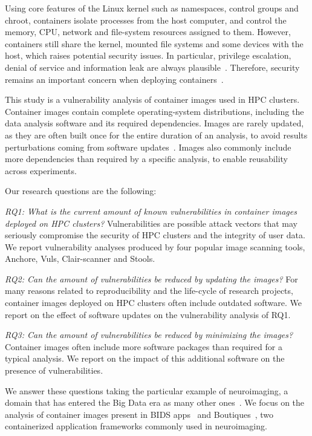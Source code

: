\documentclass[a4paper,num-refs]{oup-contemporary}
\begin{document}
Using core features of the Linux kernel such as namespaces, control groups
and chroot, containers isolate processes from the
host computer,  
and control the memory, CPU, network and file-system resources assigned to
them. However, containers still share the kernel, mounted file systems and
some devices with the host, which raises potential security issues. In
particular, privilege escalation, denial of service and information leak
are always plausible~\cite{gantikow2016providing}. Therefore, security remains 
an important concern when deploying containers~\cite{bettini2015vulnerability}.

This study is a vulnerability analysis of container images used in HPC
clusters. Container images contain complete operating-system distributions,
including the data analysis software and its required dependencies.
Images are rarely updated, as they are often built once
for the entire duration of an analysis, to avoid results perturbations
coming from software updates~\cite{gronenschild2012effects, glatard2015reproducibility}. Images also
commonly include more dependencies than required by a specific analysis, to 
enable reusability across experiments.

Our research questions are the following:

\textit{RQ1: What is the current amount of known vulnerabilities in
container images deployed on HPC clusters?} Vulnerabilities are possible
attack vectors that may seriously compromise the security of HPC clusters
and the integrity of user data. We report vulnerability analyses produced
by four popular image scanning tools, Anchore, Vuls, Clair-scanner and Stools.

\textit{RQ2: Can the amount of vulnerabilities be reduced by updating the images?}  
For many reasons related to reproducibility and the life-cycle of research
projects, container images deployed on HPC clusters often include outdated
software. We report on the effect of software updates on the vulnerability
analysis of RQ1.

\textit{RQ3: Can the amount of vulnerabilities be reduced by minimizing the images?} 
Container images often include more software packages than required for a
typical analysis. We report on the impact of this additional software on
the presence of vulnerabilities.

We answer these questions taking the particular example of neuroimaging, a
domain that has entered the Big Data era as many other
ones~\cite{van2014human}. We focus on the analysis of container images
present in BIDS apps~\cite{gorgolewski2017bids} and Boutiques~\cite{glatard2018boutiques}, two containerized
application frameworks commonly used in neuroimaging. 
\end{document}
